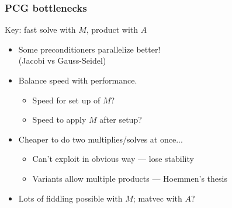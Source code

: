 \documentclass{beamer}
\begin{document}
\begin{frame}[fragile]
  \frametitle{PCG bottlenecks}

  Key: fast solve with $M$, product with $A$
  \begin{itemize}
  \item Some preconditioners parallelize better! \\
    (Jacobi vs Gauss-Seidel)
  \item Balance speed with performance.
    \begin{itemize}
    \item Speed for set up of $M$?
    \item Speed to apply $M$ after setup?
    \end{itemize}
  \item Cheaper to do two multiplies/solves at once...
    \begin{itemize}
    \item Can't exploit in obvious way --- lose stability
    \item Variants allow multiple products --- Hoemmen's thesis
    \end{itemize}
  \item Lots of fiddling possible with $M$; 
    matvec with $A$?
  \end{itemize}

\end{frame}
\end{document}
